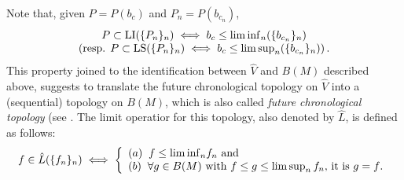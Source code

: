 Note that, given $P= P(b_{c})$ and $P_n=P(b_{c_n})$,
              \begin{equation}
                \label{eq:50}
                \begin{array}{c}
                P\subset {\rm LI}(\{P_n\}_n) \iff b_{c}\leq \liminf_n(\{b_{c_n}\}_n)\\
                \left(\hbox{resp. }P\subset {\rm LS}(\{P_n\}_n) \iff b_{c}\leq \limsup_n(\{b_{c_n}\}_n)\right).
               \end{array}
              \end{equation}
              This property joined to the identification between $\hat{V}$ and $B(M)$ described above, suggests to translate
            the future chronological topology on $\hat{V}$ into a (sequential) topology on $B(M)$, which is also called {\em future chronological topology}
            (see \cite[Section 3.3]{FHSIso2}. The limit operatior for this topology, also denoted by $\hat{L}$, is defined as follows: 
            \begin{equation}
              \label{eq:22}
              f\in \hat{L}(\{f_n\}_n) \iff \left\{
                \begin{array}{l}
                  (a)\;\; f\leq {\liminf}_n f_n \hbox{ and}\\
                  (b)\;\; \forall g\in B(M) \hbox{ with $f\leq g\leq \limsup_n f_n,$ it is $g=f$.}
                \end{array}\right.
            \end{equation}



